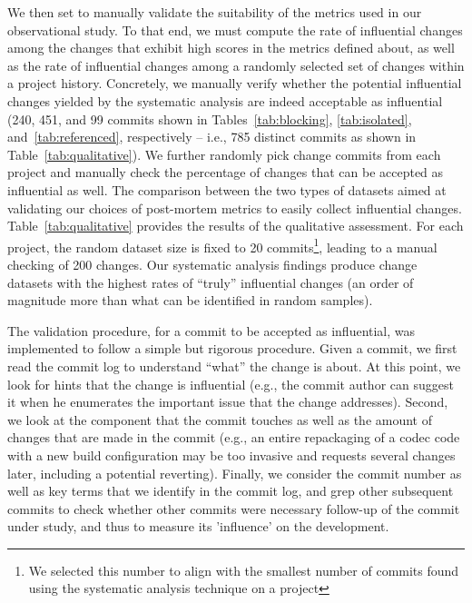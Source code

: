 We then set to manually validate the suitability of the metrics used in our observational
study. 
To that end, we must compute the rate of influential changes among the changes that
exhibit high scores in the metrics defined about, as well as the rate of influential changes
among a randomly selected set of changes within a project history.
Concretely, we manually verify whether the potential influential changes yielded by the
systematic analysis are indeed acceptable as influential (240, 451, and 99 commits shown 
in Tables~\ref{tab:blocking}, \ref{tab:isolated}, 
and~\ref{tab:referenced}, respectively -- i.e., 785 distinct commits as shown in Table~\ref{tab:qualitative}). 
We further randomly pick change commits from each project
and manually check the percentage of changes that can be accepted as influential as well. The
comparison between the two types of datasets aimed at validating our choices
of post-mortem metrics to easily collect influential changes.
Table~\ref{tab:qualitative} provides the results of the qualitative assessment.
For each project, the random dataset size is fixed to 20 commits\footnote{We selected this number to align with the smallest number of commits found using the systematic analysis technique on a project}, leading to a
manual checking of 200 changes. Our systematic analysis findings produce
change datasets with the highest rates of ``truly'' influential changes (an order
of magnitude more than what can be identified in random samples).

The validation procedure, for a commit to be accepted as influential, was implemented to follow a simple but rigorous procedure. Given a commit,
we first read the commit log to understand ``what'' the change is about. At this point, we look for
hints that the change is influential (e.g., the commit author can suggest it when he enumerates the
important issue that the change addresses). Second, we look at the component that the commit touches as well
as the amount of changes that are made in the commit (e.g., an entire repackaging of a codec code with a
new build configuration may be too invasive and requests several changes later, including a potential reverting). Finally, we consider the commit number as well as key terms that we identify in the commit log, and grep other
subsequent commits to check whether other commits were necessary follow-up of the commit under study, and thus
to measure its 'influence' on the development.

\begin{table}[h] 
\centering 
\caption{Overall manual assessment results. We
compared the percentage of changes that were manually confirmed to be
influential from the datasets yielded by our systematic analysis (see Section~\ref{sec:systemanalysis}) and a random
selection in projects. Note that we count unique commits in this table, since 
some commits can be detected by more than one method described in Section~\ref{sec:systemanalysis}.
}

\label{tab:qualitative}
\end{table}


